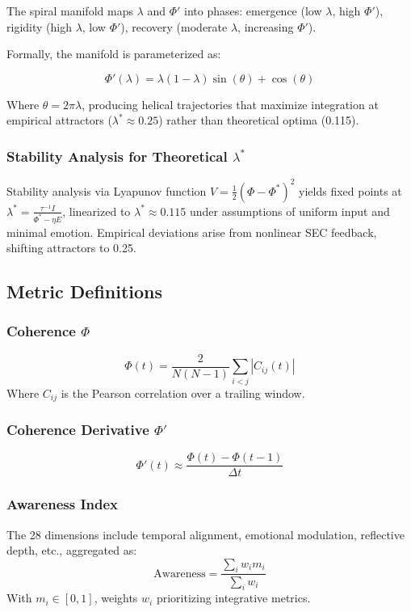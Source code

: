 \documentclass[11pt,a4paper]{article}
\begin{document}
The spiral manifold maps \(\lambda\) and \(\Phi'\) into phases: emergence (low \(\lambda\), high \(\Phi'\)), rigidity (high \(\lambda\), low \(\Phi'\)), recovery (moderate \(\lambda\), increasing \(\Phi'\)).

Formally, the manifold is parameterized as:

\[
\Phi'(\lambda) = \lambda (1 - \lambda) \sin(\theta) + \cos(\theta)
\]

Where \(\theta = 2\pi \lambda\), producing helical trajectories that maximize integration at empirical attractors (\(\lambda^* \approx 0.25\)) rather than theoretical optima (0.115).

\subsubsection{Stability Analysis for Theoretical \texorpdfstring{\(\lambda^*\)}{lambda*}}

Stability analysis via Lyapunov function \(V = \frac{1}{2} (\Phi - \Phi^*)^2\) yields fixed points at \(\lambda^* = \frac{\tau^{-1} I}{\Phi^* - \eta E}\), linearized to \(\lambda^* \approx 0.115\) under assumptions of uniform input and minimal emotion. Empirical deviations arise from nonlinear SEC feedback, shifting attractors to 0.25.

\subsection{Metric Definitions}

\subsubsection{Coherence \texorpdfstring{\(\Phi\)}{Phi}}
\[
\Phi(t) = \frac{2}{N(N-1)} \sum_{i<j} |C_{ij}(t)|
\]
Where \(C_{ij}\) is the Pearson correlation over a trailing window.

\subsubsection{Coherence Derivative \texorpdfstring{\(\Phi'\)}{Phi'}}
\[
\Phi'(t) \approx \frac{\Phi(t) - \Phi(t-1)}{\Delta t}
\]

\subsubsection{Awareness Index}
The 28 dimensions include temporal alignment, emotional modulation, reflective depth, etc., aggregated as:
\[
\text{Awareness} = \frac{\sum_i w_i m_i}{\sum_i w_i}
\]
With \(m_i \in [0,1]\), weights \(w_i\) prioritizing integrative metrics.
\end{document}
